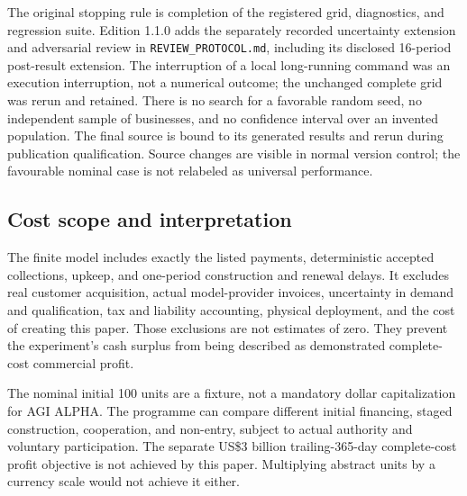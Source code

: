 The original stopping rule is completion of the registered grid, diagnostics, and regression suite. Edition 1.1.0 adds the separately recorded uncertainty extension and adversarial review in \texttt{REVIEW\_PROTOCOL.md}, including its disclosed 16-period post-result extension. The interruption of a local long-running command was an execution interruption, not a numerical outcome; the unchanged complete grid was rerun and retained. There is no search for a favorable random seed, no independent sample of businesses, and no confidence interval over an invented population. The final source is bound to its generated results and rerun during publication qualification. Source changes are visible in normal version control; the favourable nominal case is not relabeled as universal performance.

\subsection{Cost scope and interpretation}
The finite model includes exactly the listed payments, deterministic accepted collections, upkeep, and one-period construction and renewal delays. It excludes real customer acquisition, actual model-provider invoices, uncertainty in demand and qualification, tax and liability accounting, physical deployment, and the cost of creating this paper. Those exclusions are not estimates of zero. They prevent the experiment's cash surplus from being described as demonstrated complete-cost commercial profit.

The nominal initial 100 units are a fixture, not a mandatory dollar capitalization for AGI ALPHA. The programme can compare different initial financing, staged construction, cooperation, and non-entry, subject to actual authority and voluntary participation. The separate US\$3 billion trailing-365-day complete-cost profit objective is not achieved by this paper. Multiplying abstract units by a currency scale would not achieve it either.

